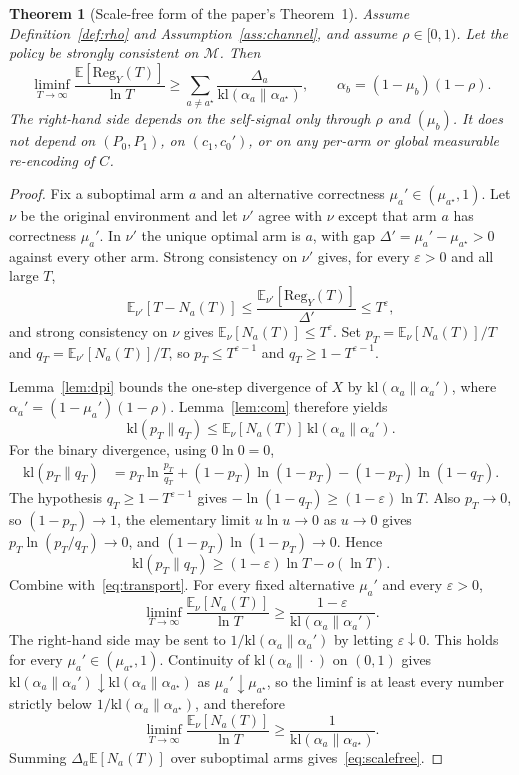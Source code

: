 \documentclass{article}
\newtheorem{theorem}{Theorem}
\theoremstyle{definition}
\theoremstyle{remark}
\newcommand{\E}{\mathbb{E}}
\newcommand{\kl}{\mathrm{kl}}
\newcommand{\Reg}{\mathrm{Reg}}
\newcommand{\eps}{\varepsilon}
\begin{document}
\begin{theorem}[Scale-free form of the paper's Theorem~1]\label{thm:scalefree}
Assume Definition~\ref{def:rho} and Assumption~\ref{ass:channel}, and assume $\rho\in[0,1)$. Let the policy be strongly consistent on $\mathcal M$. Then
\begin{equation}\label{eq:scalefree}
\liminf_{T\to\infty}\frac{\E[\Reg_Y(T)]}{\ln T}
\ge\sum_{a\neq a^\star}
\frac{\Delta_a}{\kl(\alpha_a\|\alpha_{a^\star})},
\qquad
\alpha_b=(1-\mu_b)(1-\rho).
\end{equation}
The right-hand side depends on the self-signal only through $\rho$ and $(\mu_b)$. It does not depend on $(P_0,P_1)$, on $(c_1,c_0')$, or on any per-arm or global measurable re-encoding of $C$.
\end{theorem}

\begin{proof}
Fix a suboptimal arm $a$ and an alternative correctness $\mu_a'\in(\mu_{a^\star},1)$. Let $\nu$ be the original environment and let $\nu'$ agree with $\nu$ except that arm $a$ has correctness $\mu_a'$. In $\nu'$ the unique optimal arm is $a$, with gap $\Delta'=\mu_a'-\mu_{a^\star}>0$ against every other arm. Strong consistency on $\nu'$ gives, for every $\eps>0$ and all large $T$,
\[
\E_{\nu'}[T-N_a(T)]
\le\frac{\E_{\nu'}[\Reg_Y(T)]}{\Delta'}
\le T^\eps,
\]
and strong consistency on $\nu$ gives $\E_\nu[N_a(T)]\le T^\eps$. Set $p_T=\E_\nu[N_a(T)]/T$ and $q_T=\E_{\nu'}[N_a(T)]/T$, so $p_T\le T^{\eps-1}$ and $q_T\ge 1-T^{\eps-1}$.

Lemma~\ref{lem:dpi} bounds the one-step divergence of $X$ by $\kl(\alpha_a\|\alpha_a')$, where $\alpha_a'=(1-\mu_a')(1-\rho)$. Lemma~\ref{lem:com} therefore yields
\begin{equation}\label{eq:transport}
\kl(p_T\|q_T)\le\E_\nu[N_a(T)]\,\kl(\alpha_a\|\alpha_a').
\end{equation}
For the binary divergence, using $0\ln 0=0$,
\begin{align*}
\kl(p_T\|q_T)
&=p_T\ln\frac{p_T}{q_T}+(1-p_T)\ln(1-p_T)-(1-p_T)\ln(1-q_T).
\end{align*}
The hypothesis $q_T\ge 1-T^{\eps-1}$ gives $-\ln(1-q_T)\ge(1-\eps)\ln T$. Also $p_T\to 0$, so $(1-p_T)\to 1$, the elementary limit $u\ln u\to 0$ as $u\to 0$ gives $p_T\ln(p_T/q_T)\to 0$, and $(1-p_T)\ln(1-p_T)\to 0$. Hence
\[
\kl(p_T\|q_T)\ge(1-\eps)\ln T-o(\ln T).
\]
Combine with~\eqref{eq:transport}. For every fixed alternative $\mu_a'$ and every $\eps>0$,
\[
\liminf_{T\to\infty}\frac{\E_\nu[N_a(T)]}{\ln T}
\ge\frac{1-\eps}{\kl(\alpha_a\|\alpha_a')}.
\]
The right-hand side may be sent to $1/\kl(\alpha_a\|\alpha_a')$ by letting $\eps\downarrow 0$. This holds for every $\mu_a'\in(\mu_{a^\star},1)$. Continuity of $\kl(\alpha_a\|\cdot)$ on $(0,1)$ gives $\kl(\alpha_a\|\alpha_a')\downarrow\kl(\alpha_a\|\alpha_{a^\star})$ as $\mu_a'\downarrow\mu_{a^\star}$, so the liminf is at least every number strictly below $1/\kl(\alpha_a\|\alpha_{a^\star})$, and therefore
\[
\liminf_{T\to\infty}\frac{\E_\nu[N_a(T)]}{\ln T}
\ge\frac{1}{\kl(\alpha_a\|\alpha_{a^\star})}.
\]
Summing $\Delta_a\E[N_a(T)]$ over suboptimal arms gives~\eqref{eq:scalefree}.


\end{proof}
\end{document}
